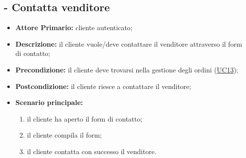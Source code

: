 \subsection{ - Contatta venditore} 
\begin{itemize}
    \item \textbf{Attore Primario:} cliente autenticato;
    \item \textbf{Descrizione:} il cliente vuole/deve contattare il venditore attraverso il form di contatto;
    \item \textbf{Precondizione:} il cliente deve trovarsi nella gestione degli ordini (\hyperref[UC13]{UC13});
    \item \textbf{Postcondizione:} il cliente riesce a contattare il venditore;
    \item \textbf{Scenario principale:}
    \begin{enumerate}
        \item il cliente ha aperto il form di contatto;
        \item il cliente compila il form;
        \item il cliente contatta con successo il venditore.
    \end{enumerate}
\end{itemize}